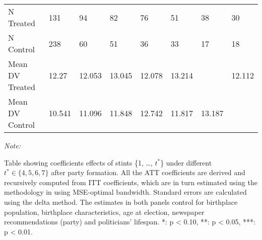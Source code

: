 \begin{table}[!h]
\begin{threeparttable}
\begin{tabular}[t]{llllllll}
\hspace{1em}N Treated & 131 & 94 & 82 & 76 & 51 & 38 & 30\\
\hspace{1em}N Control & 238 & 60 & 51 & 36 & 33 & 17 & 18\\
\hspace{1em}Mean DV Treated & 12.27 & 12.053 & 13.045 & 12.078 & 13.214 &  & 12.112\\
\hspace{1em}Mean DV Control & 10.541 & 11.096 & 11.848 & 12.742 & 11.817 & 13.187 & \\
\bottomrule
\end{tabular}
\begin{tablenotes}[para]
\item \textit{Note: } 
\item Table showing coefficients effects of stints \{1, \dots, $t^*$\} under different $t^* \in \{4,5,6,7\}$ after party formation. All the ATT coefficients are derived and recursively computed from ITT coefficients, which are in turn estimated using the methodology in \citep{cattaneo2019practical} using MSE-optimal bandwidth. Standard errors are calculated using the delta method. The estimates in both panels control for birthplace population, birthplace characteristics, age at election, newspaper recommendations (party) and politicians' lifespan. *: p < 0.10, **: p < 0.05, ***: p < 0.01. 
\end{tablenotes}
\end{threeparttable}
\end{table}
